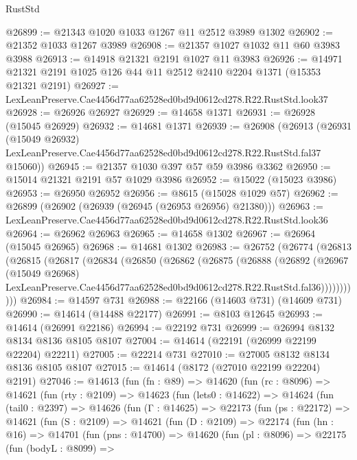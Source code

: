 \begin{lexlean}{RustStd}
\begin{coremodule}
@26899 := @21343 @1020 @1033 @1267 @11 @2512 @3989 @1302
@26902 := @21352 @1033 @1267 @3989
@26908 := @21357 @1027 @1032 @11 @60 @3983 @3988
@26913 := @14918 @21321 @2191 @1027 @11 @3983
@26926 := @14971 @21321 @2191 @1025 @126 @44 @11 @2512 @2410 @2204 @1371 (@15353 @21321 @2191)
@26927 := LexLeanPreserve.Cae4456d77aa62528ed0bd9d0612cd278.R22.RustStd.look37
@26928 := @26926 @26927
@26929 := @14658 @1371
@26931 := @26928 (@15045 @26929)
@26932 := @14681 @1371
@26939 := @26908
    (@26913
      (@26931
        (@15049 @26932)
        LexLeanPreserve.Cae4456d77aa62528ed0bd9d0612cd278.R22.RustStd.fal37
        @15060))
@26945 := @21357 @1030 @397 @57 @59 @3986 @3362
@26950 := @15014 @21321 @2191 @57 @1029 @3986
@26952 := @15022 (@15023 @3986)
@26953 := @26950 @26952
@26956 := @8615 (@15028 @1029 @57)
@26962 := @26899 (@26902 (@26939 (@26945 (@26953 @26956) @21380)))
@26963 := LexLeanPreserve.Cae4456d77aa62528ed0bd9d0612cd278.R22.RustStd.look36
@26964 := @26962 @26963
@26965 := @14658 @1302
@26967 := @26964 (@15045 @26965)
@26968 := @14681 @1302
@26983 := @26752
    (@26774
      (@26813
        (@26815
          (@26817
            (@26834
              (@26850
                (@26862
                  (@26875
                    (@26888
                      (@26892
                        (@26967
                          (@15049 @26968)
                          LexLeanPreserve.Cae4456d77aa62528ed0bd9d0612cd278.R22.RustStd.fal36)))))))))))
@26984 := @14597 @731
@26988 := @22166 (@14603 @731) (@14609 @731)
@26990 := @14614 (@14488 @22177)
@26991 := @8103 @12645
@26993 := @14614 (@26991 @22186)
@26994 := @22192 @731
@26999 := @26994 @8132 @8134 @8136 @8105 @8107
@27004 := @14614 (@22191 (@26999 @22199 @22204) @22211)
@27005 := @22214 @731
@27010 := @27005 @8132 @8134 @8136 @8105 @8107
@27015 := @14614 (@8172 (@27010 @22199 @22204) @2191)
@27046 := @14613
    (fun (fn : @89) =>
    @14620
      (fun (rc : @8096) =>
      @14621
        (fun (rty : @2109) =>
        @14623
          (fun (lets0 : @14622) =>
          @14624
            (fun (tail0 : @2397) =>
            @14626
              (fun (Γ : @14625) =>
              @22173
                (fun (ps : @22172) =>
                @14621
                  (fun (S : @2109) =>
                  @14621
                    (fun (D : @2109) =>
                    @22174
                      (fun (hn : @16) =>
                      @14701
                        (fun (pns : @14700) =>
                        @14620
                          (fun (pl : @8096) =>
                          @22175
                            (fun (bodyL : @8099) =>

\end{coremodule}
\end{lexlean}
